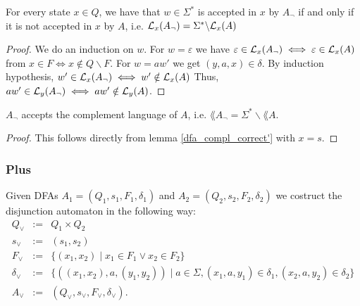 \begin{lemma}
    \label{dfa_compl_correct'}
    For every state $x \in Q$, we have that $w \in \Sigma^*$ is accepted in $x$ by $A_\neg$ if and only if it is not accepted in $x$ by $A$, i.e. $\mathcal{L}_{x}(A_\neg) = \Sigma^* \backslash \mathcal{L}_{x}(A)$ 
\end{lemma}
\begin{proof}
    We do an induction on $w$.
    For $w = \varepsilon$ we have $\varepsilon \in \mathcal{L}_{x}(A_\neg) \iff \varepsilon \in \mathcal{L}_{x}(A)$ from
    $x \in F \iff x \notin Q\backslash F$.
    For $w = aw'$ we get $(y,a,x) \in \delta$. 
    By induction hypothesis, $w' \in \mathcal{L}_{x}(A_\neg) \iff w' \notin \mathcal{L}_{x}(A)$
    Thus, $aw' \in \mathcal{L}_{y}(A_\neg) \iff aw' \notin \mathcal{L}_{y}(A)$.
\end{proof}
\begin{lemma}
    $A_\neg$ accepts the complement language of $A$, i.e. $\lang{A_\neg} = \Sigma^* \backslash \lang{A}$.
    \label{dfa_compl_correct}
\end{lemma}
\begin{proof}
    This follows directly from lemma \ref{dfa_compl_correct'} with $x = s$.
\end{proof}

\subsubsection{Plus}
\begin{definition}
    Given DFAs $A_1=(Q_1, s_1, F_1, \delta_1)$ and $A_2=(Q_2, s_2, F_2, \delta_2)$ we costruct the disjunction automaton  in the following way:
    \begin{eqnarray*}
        Q_\vee &:=& Q_1 \times Q_2 \\
        s_\vee &:=& (s_1, s_2) \\
        F_\vee &:=& \{(x_1,x_2) \; | \; x_1 \in F_1 \vee x_2 \in F_2\} \\
        \delta_\vee &:=& \{( (x_1, x_2),a,(y_1, y_2)) \; | \; a \in \Sigma, (x_1, a, y_1) \in \delta_1, (x_2, a, y_2) \in \delta_2 \} \\
        A_\vee &:=& (Q_\vee, s_\vee, F_\vee, \delta_\vee).
    \end{eqnarray*}
\end{definition}

